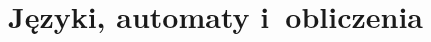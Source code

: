 \documentclass[a4paper,11pt]{article}
\begin{document}
\begin{enumerate}














































\end{enumerate}
























\section{Języki, automaty i~obliczenia}
\end{document}
